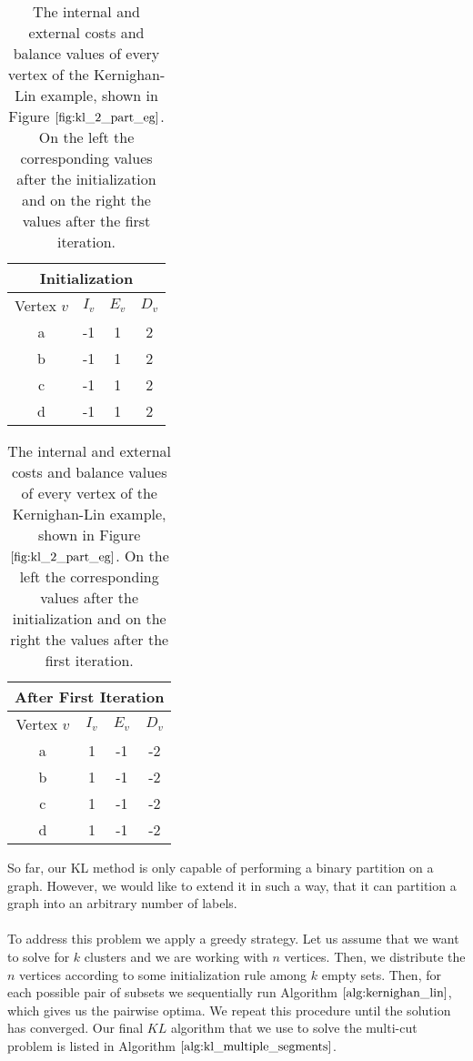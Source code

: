 \begin{table}[H]
\centering
\setlength\tabcolsep{2pt}
\begin{minipage}{0.47\textwidth}
\centering
\begin{tabular}{|c|c|c|c|}
\hline
\multicolumn{4}{|c|}{Initialization} \\ \hline
Vertex $v$ & $I_v$  & $E_v$ & $D_v$ \\ \hline
a & -1 & 1 & 2 \\ \hline
b & -1 & 1 & 2 \\ \hline
c & -1 & 1 & 2 \\ \hline
d & -1 & 1 & 2 \\ \hline
\end{tabular}
\end{minipage}%
\hfill
\begin{minipage}{0.47\textwidth}
\centering
\begin{tabular}{|c|c|c|c|}
\hline
\multicolumn{4}{|c|}{After First Iteration} \\ \hline
Vertex $v$ & $I_v$  & $E_v$ & $D_v$ \\ \hline
a & 1 & -1 & -2 \\ \hline
b & 1 & -1 & -2 \\ \hline
c & 1 & -1 & -2 \\ \hline
d & 1 & -1 & -2 \\ \hline
\end{tabular}
\end{minipage}
\caption[Kernighan-Lin Example Costs]{The internal and external costs and balance values of every vertex of the Kernighan-Lin example, shown in Figure $\ref{fig:kl_2_part_eg}$. On the left the corresponding values after the initialization and on the right the values after the first iteration.}
\label{tab:kl_example_costs}
\end{table}
So far, our KL method is only capable of performing a binary partition on a graph. However, we would like to extend it in such a way, that it can partition a graph into an arbitrary number of labels. \\ \\
To address this problem we apply a greedy strategy. Let us assume that we want to solve for $k$ clusters and we are working with $n$ vertices. Then, we distribute the $n$ vertices according to some initialization rule among $k$ empty sets. Then, for each possible pair of subsets we sequentially run Algorithm $\ref{alg:kernighan_lin}$, which gives us the pairwise optima. We repeat this procedure until the solution has converged. Our final $KL$ algorithm that we use to solve the multi-cut problem is listed in Algorithm $\ref{alg:kl_multiple_segments}$.
